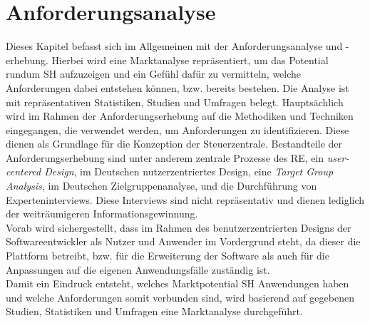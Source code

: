 \chapter{Anforderungsanalyse}
\label{chap:anforderungsanalyse}
    Dieses Kapitel befasst sich im Allgemeinen mit der Anforderungsanalyse und -erhebung. Hierbei wird eine
    Marktanalyse repräsentiert, um das Potential rundum \acl{SH} aufzuzeigen und ein Gefühl 
    dafür zu vermitteln, welche Anforderungen dabei entstehen können, bzw. bereits bestehen. Die Analyse ist 
    mit repräsentativen Statistiken, Studien und Umfragen belegt. Hauptsächlich wird im Rahmen der Anforderungserhebung 
    auf die Methodiken und Techniken eingegangen, die verwendet werden, um 
    Anforderungen zu identifizieren. Diese dienen als Grundlage für die Konzeption der Steuerzentrale. Bestandteile der 
    Anforderungserhebung sind unter anderem zentrale Prozesse des \acl{RE}, ein \textit{user-centered Design}, im Deutschen 
    nutzerzentriertes Design, eine \textit{Target Group Analysis}, im Deutschen Zielgruppenanalyse, und die Durchführung von 
    Experteninterviews. Diese Interviews sind nicht repräsentativ und dienen lediglich der weiträumigeren Informationsgewinnung. 
    \\
    Vorab wird sichergestellt, dass im Rahmen des benutzerzentrierten Designs der Softwareentwickler als Nutzer und Anwender im 
    Vordergrund steht, da dieser die Plattform betreibt, bzw. für die Erweiterung der Software als auch für die 
    Anpassungen auf die eigenen Anwendungsfälle zuständig ist.
    \\
    \linebreak
    Damit ein Eindruck entsteht, welches Marktpotential \acl{SH} Anwendungen haben und welche Anforderungen somit 
    verbunden sind, wird basierend auf gegebenen Studien, Statistiken und Umfragen eine Marktanalyse durchgeführt.

